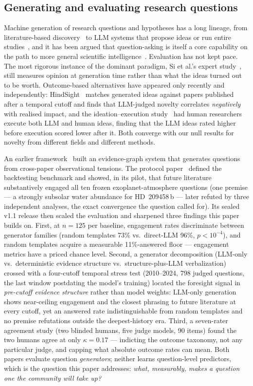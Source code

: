 \documentclass[11pt]{article}
\begin{document}
\subsection{Generating and evaluating research questions}

Machine generation of research questions and hypotheses has a long lineage,
from literature-based discovery~\cite{swanson1986} to LLM systems that
propose ideas or run entire studies~\cite{lu2024,wang2024,baek2024}, and it
has been argued that question-asking is itself a core capability on the path
to more general scientific intelligence~\cite{kitano2021}. Evaluation has
not kept pace. The most rigorous instance of the dominant paradigm, Si et
al.'s expert study~\cite{si2024}, still measures opinion at generation time
rather than what the ideas turned out to be worth. Outcome-based
alternatives have appeared only recently and independently:
HindSight~\cite{hindsight2026} matches generated ideas against papers
published after a temporal cutoff and finds that LLM-judged novelty
correlates \emph{negatively} with realised impact, and the
ideation--execution study~\cite{ideationgap2025} had human researchers
execute both LLM and human ideas, finding that the LLM ideas rated higher
before execution scored lower after it. Both converge with our null results
for novelty from different fields and different methods.

An earlier framework~\cite{paper1} built an evidence-graph system that generates
questions from cross-paper observational tensions. The
protocol paper~\cite{paper2} defined the backtesting benchmark and showed, in its
pilot, that future literature substantively
engaged all ten frozen exoplanet-atmosphere questions (one premise ---
a strongly subsolar water abundance for HD~209458\,b --- later refuted
by three independent analyses, the exact convergence the question
called for). Its sealed v1.1 release then scaled the evaluation and
sharpened three findings this paper builds on. First, at $n=125$ per
baseline, engagement rates discriminate between generator families
(random templates 73\% vs.\ direct-LLM 96\%, $p<10^{-4}$), and random
templates acquire a measurable 11\%-answered floor --- engagement
metrics have a priced chance level. Second, a generator decomposition
(LLM-only vs.\ deterministic evidence structure vs.\ structure-plus-LLM
verbalization) crossed with a four-cutoff temporal stress test
(2010--2024, 798 judged questions, the last window postdating the
model's training) located the foresight signal in \emph{pre-cutoff
evidence structure} rather than model weights: LLM-only generation
shows near-ceiling engagement and the closest phrasing to future
literature at every cutoff, yet an answered rate indistinguishable from
random templates and no premise refutations outside the deepest-history
era. Third, a seven-rater agreement study (two blinded humans, five
judge models, 90 items) found the two humans agree at only
$\kappa=0.17$ --- indicting the outcome taxonomy, not any particular
judge, and capping what absolute outcome rates can mean. Both papers
evaluate question \emph{generators}; neither learns question-level
predictors, which is the question this paper addresses: \emph{what,
measurably, makes a question one the community will take up?}
\end{document}
